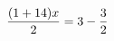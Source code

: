 \documentclass[preview]{standalone}
\begin{document}
\begin{align*}
\special{dvisvgm:raw <g id='unique000'>}\frac{(1 + 14) x}{2} = 3 - \frac{3}{2}\special{dvisvgm:raw </g>}
\end{align*}
\end{document}
